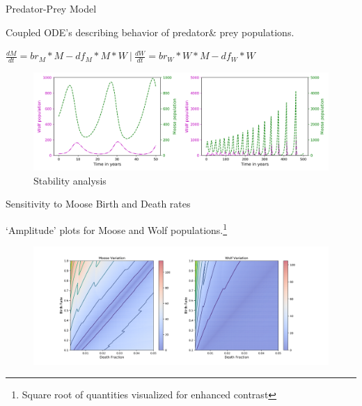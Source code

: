 \documentclass{beamer}
\begin{document}
\begin{frame}{Predator-Prey Model}
	\item Coupled ODE's describing behavior of predator\& prey populations.
	\item
$\frac{dM}{dt}=br_{M}*M-df_{M}*M*W \ |\  \frac{dW}{dt}=br_{W}*W*M-df_{W}*W$	
		\begin{figure}
		\includegraphics[scale=0.35]{../plot_notebooks/short_and_long_runs}
		\caption{Stability analysis}
		\end{figure}
\end{frame}

\begin{frame}{Sensitivity to Moose Birth and Death rates}
	\item `Amplitude' plots for Moose and Wolf populations.\footnote{Square root of quantities visualized for enhanced contrast}
	\begin{figure}
		\vspace*{-0.25cm}\hspace*{-1.1cm}\includegraphics[scale=0.35]{../plot_notebooks/sqrt_amp_vary_M}
	\end{figure}
\end{frame}
\end{document}
